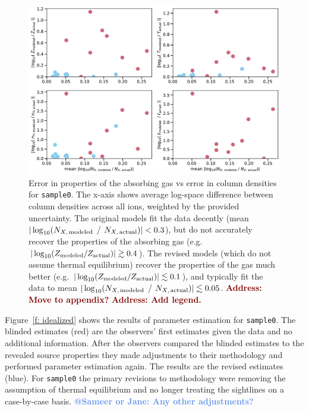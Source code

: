 \documentclass[fleqn,usenatbib]{mnras}
\makeatletter
\newcommand{\todo}[1]{\textcolor{Maroon}{\textbf{Address: #1}}}
\newcommand{\atsameer}[1]{\textcolor{CornflowerBlue}{\textbf{@Sameer or Jane: #1}}}
\makeatother
\begin{document}
\begin{figure}
    \centering
    \includegraphics[width=\textwidth]{figures/sample0/error_vs_error.pdf}
    \caption{
    Error in properties of the absorbing gas vs error in column densities for \texttt{sample0}.
    The x-axis shows average log-space difference between column densities across all ions, weighted by the provided uncertainty.
    The original models fit the data decently (mean $\vert \log_{10}( N_{X,\,{\rm modeled}}$ / $N_{X,\,{\rm actual}}) \vert < 0.3$), but do not accurately recover the properties of the absorbing gas (e.g. $\vert \log_{10}( Z_{\rm modeled} / Z_{\rm actual}) \vert \gtrsim 0.4$).
    The revised models (which do not assume thermal equilibrium) recover the properties of the gas much better (e.g. $\vert \log_{10}( Z_{\rm modeled} / Z_{\rm actual}) \vert \lesssim 0.1$), and typically fit the data to mean $\vert \log_{10}( N_{X,\,{\rm modeled}}$ / $N_{X,\,{\rm actual}}) \vert \lesssim 0.05$.
    \todo{Move to appendix?}
    \todo{Add legend.}
    }
    \label{f: error vs error}
\end{figure}

Figure~\ref{f: idealized} shows the results of parameter estimation for \texttt{sample0}.
The blinded estimates (red)  are the observers' first estimates given the data and no additional information.
After the observers compared the blinded estimates to the revealed source properties they made adjustments to their methodology and performed parameter estimation again.
The results are the revised estimates (blue).
For \texttt{sample0} the primary revisions to methodology were removing the assumption of thermal equilibrium and no longer treating the sightlines on a case-by-case basis.
\atsameer{Any other adjustments?}
\end{document}
